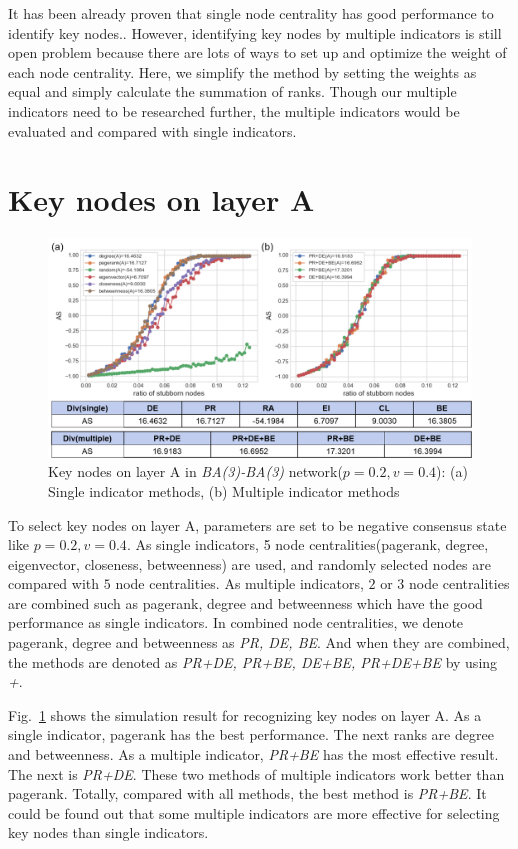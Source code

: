 It has been already proven that single node centrality has good performance to identify key nodes.\parencite{koschutzki2008, francisco2019, bianconi2018}. However, identifying key nodes by multiple indicators is still open problem because there are lots of ways to set up and optimize the weight of each node centrality.\parencite{huang2014}  Here, we simplify the method by setting the weights as equal and simply calculate the summation of ranks. Though our multiple indicators need to be researched further, the multiple indicators would be evaluated and compared with single indicators.\\
 
\section{Key nodes on layer A}
\begin{figure}[!htb]
	\centering
	\includegraphics[width=\hsize]{figure/chap5_keynode_A.png}
	\caption{Key nodes on layer A in \textit{BA(3)-BA(3)} network($p=0.2, v=0.4$): (a) Single indicator methods, (b) Multiple indicator methods}
	\label{chap5_keynode_A}
\end{figure}
To select key nodes on layer A, parameters are set to be negative consensus state like $p=0.2, v=0.4$.  As single indicators, 5 node centralities(pagerank, degree, eigenvector, closeness, betweenness) are used, and randomly selected nodes are compared with $5$ node centralities. As multiple indicators, $2$ or $3$ node centralities are combined such as pagerank, degree and betweenness which have the good performance as single indicators. In combined node centralities, we denote pagerank, degree and betweenness as \textit{PR, DE, BE}. And when they are combined, the methods are denoted as \textit{PR+DE, PR+BE, DE+BE, PR+DE+BE} by using \textit{+}. 

Fig.~\ref{chap5_keynode_A} shows the simulation result for recognizing key nodes on layer A. As a single indicator, pagerank has the best performance. The next ranks are degree and betweenness. As a multiple indicator, \textit{PR+BE} has the most effective result. The next is \textit{PR+DE}. These two methods of multiple indicators work better than pagerank. Totally, compared with all methods, the best method is \textit{PR+BE}. It could be found out that some multiple indicators are more effective for selecting key nodes than single indicators. \\

